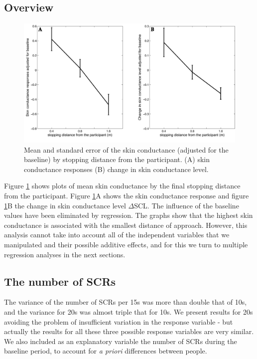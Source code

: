 \documentclass[
		twoside,openright,titlepage,numbers=noenddot,manychapters,
		headinclude,%
                footinclude=false,cleardoublepage=empty,
                BCOR=5mm,
		fontsize=11pt, %
                 enabledeprecatedfontcommands]{scrreprt}
\begin{document}
\subsection{Overview}

\begin{figure}[]
\begin{center}
\includegraphics[width=12cm]{figures/proxemics/results1.jpg}
\caption{  Mean and standard error of the skin conductance (adjusted for the baseline) by stopping distance from the participant. (A) skin conductance responses (B) change in skin conductance level.}
\label{fig_prox_results1}
\end{center}

\end{figure} 


Figure \ref{fig_prox_results1} shows plots of mean skin conductance by the final stopping distance from the participant.  Figure \ref{fig_prox_results1}A shows the skin conductance response and figure \ref{fig_prox_results1}B the change in skin conductance level $\Delta$SCL. The influence of the baseline values have been eliminated by regression. The graphs show that the highest skin conductance is associated with the smallest distance of approach. However, this analysis cannot take into account all of the independent variables that we manipulated and their possible additive effects, and for this we turn to multiple regression analyses in the next sections.



\subsection{ The number of SCRs}
The variance of the number of SCRs per 15s was more than double that of 10s, and the variance for 20s was almost triple that for 10s. We present results for 20s avoiding the problem of insufficient variation in the response variable - but actually the results for all these three possible response variables are very similar. We also included as an explanatory variable the number of SCRs during the baseline period, to account for \emph{a priori} differences between people.
\end{document}
